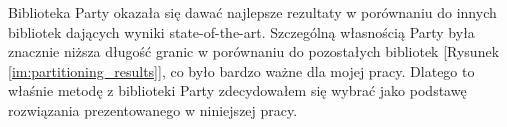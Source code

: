 Biblioteka Party \cite{1364754} okazała się dawać najlepsze rezultaty w porównaniu do innych bibliotek dających wyniki
state-of-the-art. Szczególną własnością Party była znacznie niższa długość granic w porównaniu do pozostałych bibliotek
[Rysunek \ref{im:partitioning_results}], co było bardzo ważne dla mojej pracy. Dlatego to właśnie metodę z biblioteki
Party zdecydowałem się wybrać jako podstawę rozwiązania prezentowanego w niniejszej pracy.